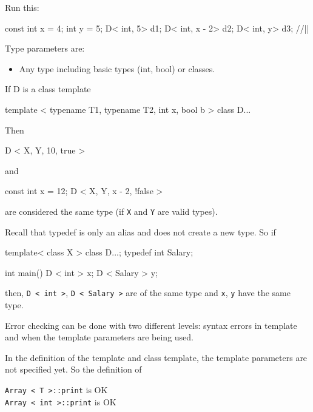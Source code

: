 Run this:

\begin{consolethree}[escapeinside=||]
const int x = 4;
int y = 5;
D< int, 5> d1;
D< int, x - 2> d2;
D< int, y> d3; //||
\end{consolethree}

Type parameters are:

\begin{itemize}
\item
  Any type including basic types (int, bool) or classes.
\end{itemize}

If D is a class template

\begin{console}
template < typename T1, typename T2,
         int x, bool b >
class D{...} 
\end{console}

Then

\begin{console}
D < X, Y, 10, true > 
\end{console}

and

\begin{console}
const int x = 12;
D < X, Y, x - 2, !false > 
\end{console}

are considered the same type (if \texttt{X} and \texttt{Y} are valid types).

Recall that typedef is only an alias and does not create a new type. So if

\begin{console}
template< class X >
class D{...};
typedef int Salary;

int main()
{    
     D < int > x;       
     D < Salary > y;
}
\end{console}

then, \texttt{D < int >}, \texttt{D < Salary >} are of the same type and \texttt{x}, \texttt{y} have the same type.

Error checking can be done with two different levels: syntax errors in template and when the template parameters are being used.

In the definition of the template and class template, the template parameters are not specified yet. So the definition of

\texttt{Array < T >::print} is OK\\
\texttt{Array < int >::print} is OK\\

